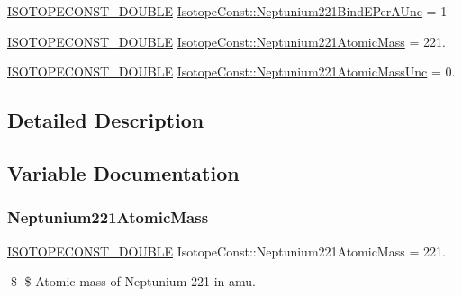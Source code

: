 \begin{DoxyCompactItemize}
\mbox{\hyperlink{group___isotope_const-_macros_ga8f45a7272ce02c0b4c65c44636ed719a}{I\+S\+O\+T\+O\+P\+E\+C\+O\+N\+S\+T\+\_\+\+D\+O\+U\+B\+LE}} \mbox{\hyperlink{group___isotope_const-_neptunium-_np221_gaf384a45ec324c887c5a69ff3fa0ea58e}{Isotope\+Const\+::\+Neptunium221\+Bind\+E\+Per\+A\+Unc}} = 1
\item 
\mbox{\hyperlink{group___isotope_const-_macros_ga8f45a7272ce02c0b4c65c44636ed719a}{I\+S\+O\+T\+O\+P\+E\+C\+O\+N\+S\+T\+\_\+\+D\+O\+U\+B\+LE}} \mbox{\hyperlink{group___isotope_const-_neptunium-_np221_ga382e2e52ebaa15eec881f5cc26201d88}{Isotope\+Const\+::\+Neptunium221\+Atomic\+Mass}} = 221.
\item 
\mbox{\hyperlink{group___isotope_const-_macros_ga8f45a7272ce02c0b4c65c44636ed719a}{I\+S\+O\+T\+O\+P\+E\+C\+O\+N\+S\+T\+\_\+\+D\+O\+U\+B\+LE}} \mbox{\hyperlink{group___isotope_const-_neptunium-_np221_ga5562b5250a89fada5e296b7d95ce3e0e}{Isotope\+Const\+::\+Neptunium221\+Atomic\+Mass\+Unc}} = 0.
\end{DoxyCompactItemize}


\subsection{Detailed Description}


\subsection{Variable Documentation}
\mbox{\label{group___isotope_const-_neptunium-_np221_ga382e2e52ebaa15eec881f5cc26201d88}} 
\subsubsection{\texorpdfstring{Neptunium221\+Atomic\+Mass}{Neptunium221AtomicMass}}
{\footnotesize\ttfamily \mbox{\hyperlink{group___isotope_const-_macros_ga8f45a7272ce02c0b4c65c44636ed719a}{I\+S\+O\+T\+O\+P\+E\+C\+O\+N\+S\+T\+\_\+\+D\+O\+U\+B\+LE}} Isotope\+Const\+::\+Neptunium221\+Atomic\+Mass = 221.}

\$ \$ Atomic mass of Neptunium-\/221 in amu. \mbox{\label{group___isotope_const-_neptunium-_np221_ga5562b5250a89fada5e296b7d95ce3e0e}} 
